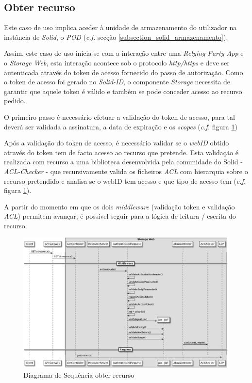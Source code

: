 \subsection{Obter recurso}
Este caso de uso implica aceder à unidade de armazenamento do utilizador na instância de \emph{Solid}, o \emph{\acrshort{POD}} (\emph{c.f.} secção \ref{subsection_solid_armazenamento}). 

Assim, este caso de uso inicia-se com a interação entre uma \emph{Relying Party App} e o \emph{Storage Web}, esta interação acontece sob o protocolo \emph{http/https} e deve ser autenticada através do token de acesso fornecido do passo de autorização.
Como o token de acesso foi gerado no \emph{Solid-ID}, o componente \emph{Storage} necessita de garantir que aquele token é válido e também se pode conceder acesso ao recurso pedido.

O primeiro passo é necessário efetuar a validação do token de acesso, para tal deverá ser validada a assinatura, a data de expiração e os \emph{scopes} (\emph{c.f.} figura \ref{retrieve_resource_sd})

Após a validação do token de acesso, é necessário validar se o \emph{webID} obtido através do token tem de facto acesso ao recurso que pretende. Esta validação é realizada com recurso a uma biblioteca desenvolvida pela comunidade do Solid - \emph{ACL-Checker} - que recursivamente valida os ficheiros \emph{\acrshort{ACL}} com hierarquia sobre o recurso pretendido e analisa se o webID tem acesso e que tipo de acesso tem (\emph{c.f.} figura \ref{retrieve_resource_sd}).

A partir do momento em que os dois \emph{middleware} (validação token e validação \emph{\acrshort{ACL}}) permitem avançar, é possível seguir para a lógica de leitura / escrita do recurso.

\begin{figure}[H]
    \begin{center}
    \includegraphics[width=1 \textwidth]{figures/retrieve_resource_sd_complete.eps}
    \caption{Diagrama de Sequência obter recurso}
            \label{retrieve_resource_sd}
    \end{center}
\end{figure}

